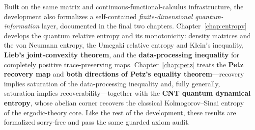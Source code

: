 Built on the same matrix and continuous-functional-calculus infrastructure, the development also
formalizes a self-contained \emph{finite-dimensional quantum-information} layer, documented in the
final two chapters. Chapter~\ref{chap:entropy} develops the quantum relative entropy and its
monotonicity: density matrices and the von Neumann entropy, the Umegaki relative entropy and
Klein's inequality, \textbf{Lieb's joint-convexity theorem}, and the \textbf{data-processing
inequality} for completely positive trace-preserving maps. Chapter~\ref{chap:petz} treats the
\textbf{Petz recovery map} and \textbf{both directions of Petz's equality theorem}---recovery
implies saturation of the data-processing inequality and, fully generally, saturation implies
recoverability---together with the \textbf{CNT quantum dynamical entropy}, whose abelian corner
recovers the classical Kolmogorov--Sinai entropy of the ergodic-theory core. Like the rest of the
development, these results are formalized sorry-free and pass the same guarded axiom audit.
